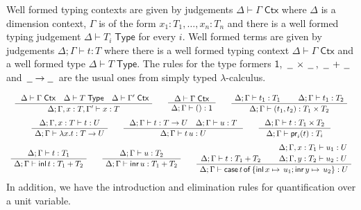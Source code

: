 \documentclass[a4paper,UKenglish]{lipics}
\newcommand{\ra}{\rightarrow}
\newcommand{\msf}[1]{\mathsf{#1}} %
\newcommand{\blank}{\, \underline{\hspace{2mm}} \,}
\newcommand{\unitTy}{\msf{1}}
\newcommand{\cj}[2]{#1 \vdash #2 \; \msf{ Ctx}}
\newcommand{\Tj}[2]{#1 \vdash #2 \; \msf{ Type}}
\newcommand{\tj}[4]{#1;#2 \vdash #3 : #4}
\newcommand{\proj}{\mathsf{pr}}
\newcommand{\inl}{\mathsf{inl}}
\newcommand{\inr}{\mathsf{inr}}
\newcommand{\case}[5]{\mathsf{case}\,#1\,\mathsf{of}\,\{\inl\,#2 \mapsto\,#3; \inr\,#4\mapsto\,#5\}}
\begin{document}
\vspace{3mm}  Well formed typing contexts are given by judgements
$\cj\Delta\Gamma $ where $\Delta$ is a dimension context, $\Gamma$ is
of the form ${x_1 : T_1, \ldots, x_n:T_n}$ and there is a well formed
typing judgement $\Tj\Delta{ T_i}$ for every $i$. Well formed terms
are given by judgements $\tj \Delta \Gamma t T$ where there is a
well formed typing context $\cj \Delta \Gamma$ and
a well formed type $\Tj \Delta T $. The rules for
the type formers $\unitTy$, $\blank\times\blank$, $\blank+\blank$ and $\blank \! \ra \! \blank$ are the usual ones from
simply typed $\lambda$-calculus.

\[\begin{array}{c}
\AxiomC{
$\cj \Delta\Gamma\quad
\Tj\Delta T\quad
\cj\Delta {\Gamma'}$}
\UnaryInfC
{$\tj \Delta{\Gamma,x:T,\Gamma'}xT$}
\DisplayProof
\qquad
\AxiomC{
$\cj\Delta {\Gamma}
$
}
\UnaryInfC
{$\tj \Delta{\Gamma}{()}\unitTy$}
\DisplayProof
\qquad
\AxiomC{$\tj\Delta {\Gamma} {t_1}{T_1}$}
\AxiomC{$\tj\Delta {\Gamma} {t_1}{T_2}$}
\BinaryInfC
{$\tj \Delta{\Gamma}{(t_1,t_2)}{T_1\times T_2}$}
\DisplayProof
\\[5mm]
\AxiomC{
$
\tj\Delta {\Gamma,x:T} {t}{U}
$
}
\UnaryInfC
{$\tj\Delta {\Gamma} {\lambda x.t}{T\to U}$}
\DisplayProof
\qquad
\AxiomC{
$
\tj\Delta {\Gamma} {t}{T\to U}\quad
\tj\Delta {\Gamma} {u}{T}
$
}
\UnaryInfC
{$\tj \Delta{\Gamma}{t\,u}U$}
\DisplayProof
\qquad
\AxiomC{
$
\tj\Delta {\Gamma} {t}{T_1\times T_2}
$
}
\UnaryInfC
{$\tj\Delta {\Gamma} {\proj_i(t)}{T_i}$}
\DisplayProof
\\[5mm]
\AxiomC{
$
\tj\Delta {\Gamma} {t}{T_1}
$
}
\UnaryInfC
{$\tj\Delta {\Gamma} {\inl\,t}{T_1 + T_2}$}
\DisplayProof
\qquad
\AxiomC{
$
\tj\Delta {\Gamma} {u}{T_2}
$
}
\UnaryInfC
{$\tj\Delta {\Gamma} {\inr\,u}{T_1 + T_2}$}
\DisplayProof
\qquad
\AxiomC{$\tj\Delta {\Gamma} {t}{T_1 + T_2}$}
\AxiomC{$\tj\Delta {\Gamma, x : T_1} {u_1}{U}$}
  \noLine
  \UnaryInfC{$\tj\Delta {\Gamma, y : T_2} {u_2}{U}$}
\BinaryInfC
{$\tj\Delta {\Gamma} {\case{t}{x}{u_1}{y}{u_2}}{U}$}
\DisplayProof
\end{array}\]
%
In addition, we have the introduction and elimination rules for quantification over a unit variable.
\end{document}
